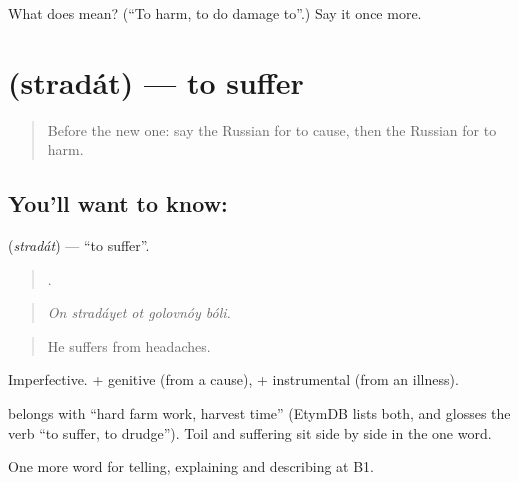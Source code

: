 \begin{tcolorbox}[breakable,colback=teal!4,colframe=teal!35!black,title={Before you move on}]
What does  mean? (\textquotedblleft{}To harm, to do damage to\textquotedblright{}.) Say it once more.
\end{tcolorbox}
\section[\texorpdfstring{\ru{страдать} (stradát)}{страдать (stradát)}]{ (stradát) — to suffer}

\label{lesson:RU-C353-stradat}



\begin{quote}
Before the new one: say the Russian for to cause, then the Russian for to harm.
\end{quote}

\subsection*{You'll want to know: }
\textbf{} (\emph{stradát}) — \textquotedblleft{}to suffer\textquotedblright{}.

\begin{quote}
    .
\end{quote}

\begin{quote}
\emph{On stradáyet ot golovnóy bóli.}
\end{quote}

\begin{quote}
He suffers from headaches.
\end{quote}

Imperfective. \emph{ } + genitive (from a cause), \emph{} + instrumental (from an illness).

\begin{cousinweb}
\textbf{} belongs with \emph{} \textquotedblleft{}hard farm work, harvest time\textquotedblright{} (EtymDB lists both, and glosses the verb \textquotedblleft{}to suffer, to drudge\textquotedblright{}). Toil and suffering sit side by side in the one word.
\end{cousinweb}

\begin{grammarlens}[title={What you've built}]
One more word for telling, explaining and describing at B1.
\end{grammarlens}

